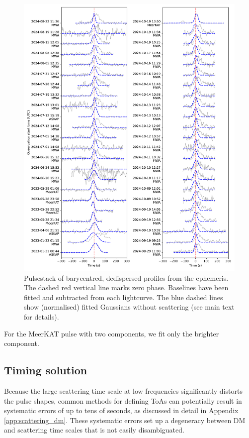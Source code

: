 \documentclass[preprint2,linenumbers]{aastex631}
\begin{document}
\begin{figure}[tp]
      \centering
          \includegraphics[width=0.95\linewidth]{pulsestack.pdf}
              \caption{Pulsestack of barycentred, dedispersed profiles from the ephemeris. The dashed red vertical line marks zero phase. Baselines have been fitted and subtracted from each lightcurve. The blue dashed lines show (normalised) fitted Gaussians without scattering (see main text for details).}
                  \label{fig:pulsestack}
\end{figure}

For the MeerKAT pulse with two components, we fit only the brighter component.

\subsection{Timing solution} \label{sec:timing}

Because the large scattering time scale at low frequencies significantly distorts the pulse shapes, common methods for defining ToAs can potentially result in systematic errors of up to tens of seconds, as discussed in detail in Appendix \ref{app:scattering_dm}.
These systematic errors set up a degeneracy between DM and scattering time scales that is not easily disambiguated.
\end{document}
